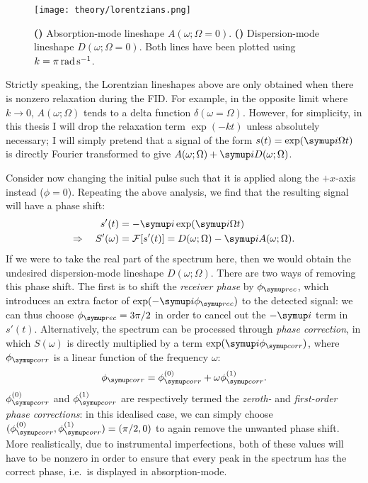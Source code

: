 \begin{figure}[htbp]
    \centering
    \texttt{[image: theory/lorentzians.png]}%
    {\label{fig:lorentzians_absorption}}%
    {\label{fig:lorentzians_dispersion}}%
    \caption[Absorption- and dispersion-mode Lorentzian lineshapes]{
        \textbf{()} Absorption-mode lineshape $A(\omega; \Omega = 0)$.
        \textbf{()} Dispersion-mode lineshape $D(\omega; \Omega = 0)$.
            Both lines have been plotted using $k = \qty[parse-numbers=false]{\pi}{\radian\per\second}$.
    }
    \label{fig:lorentzians}
\end{figure}

Strictly speaking, the Lorentzian lineshapes above are only obtained when there is nonzero relaxation during the FID.
For example, in the opposite limit where $k \to 0$, $A(\omega; \Omega)$ tends to a delta function $\delta(\omega = \Omega)$.
However, for simplicity, in this thesis I will drop the relaxation term $\exp(-kt)$ unless absolutely necessary; I will simply pretend that a signal of the form $s(t) = \exp(\mi \Omega t)$ is directly Fourier transformed to give $A(\omega; \Omega) + \mi D(\omega; \Omega)$.

Consider now changing the initial pulse such that it is applied along the $+x$-axis instead ($\phi = 0$).
Repeating the above analysis, we find that the resulting signal will have a phase shift:
\begin{align}
    \label{eq:fid_phase_shifted}
    s'(t) &= -\mi\exp(\mi\Omega t) \\
    \Rightarrow \quad S'(\omega) &= \mathcal{F}[s'(t)] = D(\omega;\Omega) - \mi A(\omega;\Omega).
\end{align}
If we were to take the real part of the spectrum here, then we would obtain the undesired dispersion-mode lineshape $D(\omega;\Omega)$.
There are two ways of removing this phase shift.
The first is to shift the \textit{receiver phase} by $\phirec$, which introduces an extra factor of $\exp(-\mi\phirec)$ to the detected signal: we can thus choose $\phirec = 3\pi/2$ in order to cancel out the $-\mi$ term in $s'(t)$.
Alternatively, the spectrum can be processed through \textit{phase correction}, in which $S(\omega)$ is directly multiplied by a term $\exp(\mi\phicorr)$, where $\phicorr$ is a linear function of the frequency $\omega$:
\begin{equation}
    \label{eq:phase_correction}
    \phicorr = \phicorr^{(0)} + \omega\phicorr^{(1)}.
\end{equation}
$\phicorr^{(0)}$ and $\phicorr^{(1)}$ are respectively termed the \textit{zeroth-} and \textit{first-order phase corrections}: in this idealised case, we can simply choose $(\phicorr^{(0)}, \phicorr^{(1)}) = (\pi/2, 0)$ to again remove the unwanted phase shift.
More realistically, due to instrumental imperfections, both of these values will have to be nonzero in order to ensure that every peak in the spectrum has the correct phase, i.e.\ is displayed in absorption-mode.

